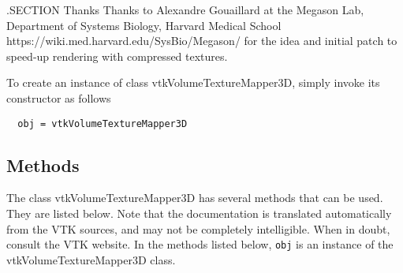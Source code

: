  .SECTION Thanks
 Thanks to Alexandre Gouaillard at the Megason Lab, Department of Systems
 Biology, Harvard Medical School
 https://wiki.med.harvard.edu/SysBio/Megason/
 for the idea and initial patch to speed-up rendering with compressed
 textures.


To create an instance of class vtkVolumeTextureMapper3D, simply
invoke its constructor as follows
\begin{verbatim}
  obj = vtkVolumeTextureMapper3D
\end{verbatim}
\subsection{Methods}

The class vtkVolumeTextureMapper3D has several methods that can be used.
  They are listed below.
Note that the documentation is translated automatically from the VTK sources,
and may not be completely intelligible.  When in doubt, consult the VTK website.
In the methods listed below, \verb|obj| is an instance of the vtkVolumeTextureMapper3D class.
